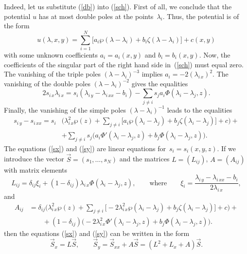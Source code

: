 \documentclass[a4paper,11pt]{article}
\newcommand{\vS}{\Vec{S}}
\theoremstyle{plain}
\theoremstyle{remark}
\begin{document}
Indeed, let us substitute (\ref{db}) into (\ref{sch}).
First of all, we conclude that the potential $u$ has at most double poles
at the points~$\lambda_i$. Thus, the potential is of the form
$$
u(\lambda,x,y)=\sum_{i=1}^N \bigl[
a_i \wp(\lambda-\lambda_i)+b_i \zeta(\lambda-\lambda_i) \bigr]+c(x,y)
$$
with some unknown coefficients $a_i=a_i(x,y)$ and $b_i=b_i(x,y)$.
Now, the coefficients of the singular part of the right hand side in~(\ref{sch})
must equal zero. The vanishing of the triple poles $(\lambda-\lambda_i)^{-3}$
implies $a_i=-2(\lambda_{i\,x})^2$.
The vanishing of the double poles $(\lambda-\lambda_i)^{-2}$ gives
the equalities
\begin{equation}\label{sx}
2s_{i\,x} \lambda_{i\,x}=s_i (\lambda_{i\,y}-\lambda_{i\,xx}-b_i)
-\sum_{j\ne i} s_j a_i \Phi(\lambda_i-\lambda_j,z) .
\end{equation}
Finally, the vanishing of the simple poles $(\lambda-\lambda_i)^{-1}$
leads to the equalities
\begin{equation}\label{sy}
\begin{aligned}
s_{i\,y}-s_{i\,xx}=s_i & \biggl( \lambda^2_{i\,x}\wp(z) +
\sum_{j\ne i} \bigl[ a_i \wp(\lambda_i-\lambda_j)+
b_j\zeta(\lambda_i-\lambda_j) \bigr] + c \biggr) +{}\\
{}&+\sum_{j\ne i} s_j \bigl( a_i \Phi'(\lambda_i-\lambda_j,z)+
b_j\Phi(\lambda_i-\lambda_j,z) \bigr) .
\end{aligned}
\end{equation}
The equations (\ref{sx}) and (\ref{sy}) are linear equations
for~$s_i=s_i(x,y,z)$. If we introduce the vector $\vS=(s_1,\dots,s_N)$
and the matrices $L=(L_{ij})$, $A=(A_{ij})$ with matrix elements
\begin{equation}\label{lij}
L_{ij}=\delta_{ij}\xi_i+(1-\delta_{ij}) \lambda_{i\,x}
\Phi(\lambda_i-\lambda_j,z),
\qquad\mbox{where}\qquad
\xi_i=\frac{\lambda_{i\,y}-\lambda_{i\,xx}-b_i}{2\lambda_{i\,x}},
\end{equation}
and
$$
\begin{aligned}
A_{ij} &=\delta_{ij}\biggl( \lambda^2_{i\,x}\wp(z) +\sum_{j\ne i}
\bigl[ -2\lambda_{i\,x}^2 \wp(\lambda_i-\lambda_j)+
b_j\zeta(\lambda_i-\lambda_j) \bigr] + c \biggr) +{}\\
{}&\qquad{}+(1-\delta_{ij}) \bigl( -2\lambda_{i\,x}^2
\Phi'(\lambda_i-\lambda_j,z)+ b_j\Phi(\lambda_i-\lambda_j,z) \bigr) .
\end{aligned}
$$
then the equations (\ref{sx}) and (\ref{sy}) can be written in the
form
\begin{equation}\label{la}
\vS_x=L \vS,\qquad \vS_y=\vS_{xx}+A \vS=(L^2+L_x+A)\vS.
\end{equation}
\end{document}

